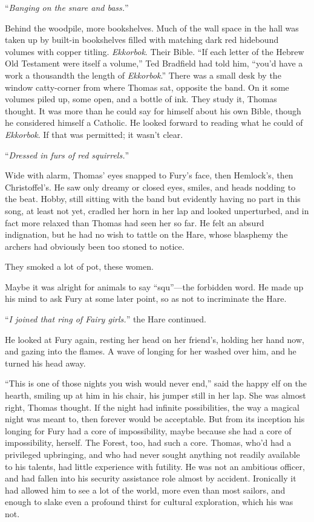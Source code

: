 \documentclass[11pt,a5paper]{article}
\begin{document}
``\emph{Banging on the snare and bass.}''

Behind the woodpile, more bookshelves. Much of the wall space in the hall was taken up by built-in bookshelves filled with matching dark red hidebound volumes with copper titling. \emph{Ekkorbok}. Their Bible. ``If each letter of the Hebrew Old Testament were itself a volume,'' Ted Bradfield had told him, ``you'd have a work a thousandth the length of \emph{Ekkorbok}.'' There was a small desk by the window catty-corner from where Thomas sat, opposite the band. On it some volumes piled up, some open, and a bottle of ink. They study it, Thomas thought. It was more than he could say for himself about his own Bible, though he considered himself a Catholic. He looked forward to reading what he could of \emph{Ekkorbok}. If that was permitted; it wasn't clear.

``\emph{Dressed in furs of red squirrels.}''

Wide with alarm, Thomas' eyes snapped to Fury's face, then Hemlock's, then Christoffel's. He saw only dreamy or closed eyes, smiles, and heads nodding to the beat. Hobby, still sitting with the band but evidently having no part in this song, at least not yet, cradled her horn in her lap and looked unperturbed, and in fact more relaxed than Thomas had seen her so far. He felt an absurd indignation, but he had no wish to tattle on the Hare, whose blasphemy the archers had obviously been too stoned to notice.

They smoked a lot of pot, these women.

Maybe it was alright for animals to say ``squ''---the forbidden word. He made up his mind to ask Fury at some later point, so as not to incriminate the Hare.

``\emph{I joined that ring of Fairy girls.}'' the Hare continued.

He looked at Fury again, resting her head on her friend's, holding her hand now, and gazing into the flames. A wave of longing for her washed over him, and he turned his head away.

``This is one of those nights you wish would never end,'' said the happy elf on the hearth, smiling up at him in his chair, his jumper still in her lap. She was almost right, Thomas thought. If the night had infinite possibilities, the way a magical night was meant to, then forever would be acceptable. But from its inception his longing for Fury had a core of impossibility, maybe because she had a core of impossibility, herself. The Forest, too, had such a core. Thomas, who'd had a privileged upbringing, and who had never sought anything not readily available to his talents, had little experience with futility. He was not an ambitious officer, and had fallen into his security assistance role almost by accident. Ironically it had allowed him to see a lot of the world, more even than most sailors, and enough to slake even a profound thirst for cultural exploration, which his was not.
\end{document}

